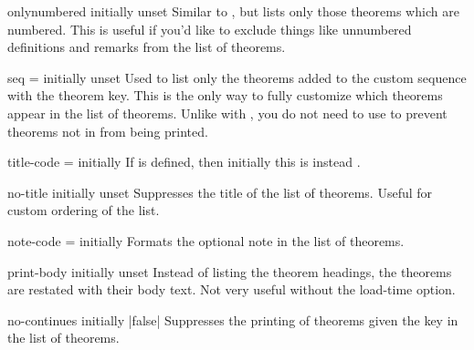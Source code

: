 \documentclass{ltxdoc}
\newcommand{\ttbraces}[1]{\braces{\texttt{#1}}}
\begin{document}
\begin{docKey}{onlynumbered}
  {}
  {initially unset}
Similar to , but lists only those theorems which are numbered. This is useful if you'd like to exclude things like unnumbered definitions and remarks from the list of theorems.
\end{docKey}

\begin{docKey}[][doc label=listof/seq]{seq}
  {=}
  {initially unset}
Used to list only the theorems added to the custom sequence  with the  theorem key. This is the only way to fully customize which theorems appear in the list of theorems. Unlike with , you do not need to use  to prevent theorems not in  from being printed.
\end{docKey}

\begin{docKey}{title-code}
  {=}
  {initially \ttbraces{\#1}}
If  is defined, then initially this is instead \ttbraces{\#1}.
\end{docKey}

\begin{docKey}{no-title}
  {}
  {initially unset}
Suppresses the title of the list of theorems. Useful for custom ordering of the list.

\begin{keythmscode}[]
\listofkeytheorems[show=example]
\listofkeytheorems[show=solution,no-title]
\end{keythmscode}

\end{docKey}

\begin{docKey}{note-code}
  {=}
  {initially \ttbraces{ (\#1)}}
Formats the optional note in the list of theorems.
\end{docKey}

\begin{docKey}{print-body}
  {}
  {initially unset}
Instead of listing the theorem headings, the theorems are restated with their body text. Not very useful without the  load-time option.
\end{docKey}

\begin{docKey}{no-continues}
  {}
  {initially |false|}
Suppresses the printing of theorems given the  key in the list of theorems.
\end{docKey}
\end{document}
